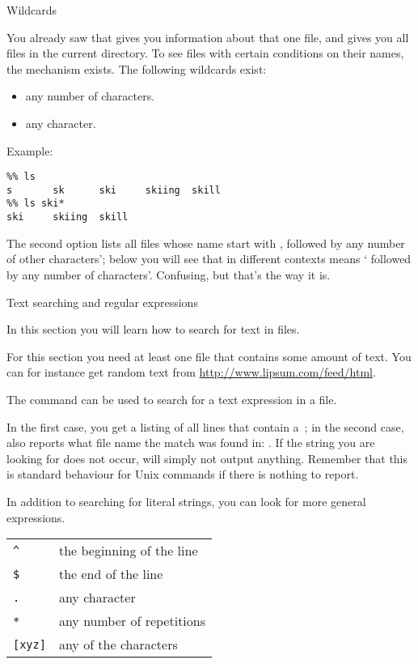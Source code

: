  {Wildcards}
\label{sec:shell-wildcard}

You already saw that  gives you information about that
one file, and  gives you all files in the current directory. To
see files with certain conditions on their names, the
 mechanism exists. The following wildcards exist:
\begin{itemize}
\item [\n{*}] any number of characters.
\item [\n{?}] any character.
\end{itemize}
Example:
\begin{verbatim}
%% ls
s       sk      ski     skiing  skill
%% ls ski*
ski     skiing  skill
\end{verbatim}
The second option lists all files whose name start with
, followed by any number of other characters'; below you will
see that in different contexts  means ` followed by any
number of  characters'. Confusing, but that's the way it is.

 {Text searching and regular expressions}
\label{sec:regexp}

\begin{purpose}
  In this section you will learn how to search for text in files.
\end{purpose}

For this section you need at least one file that contains some amount
of text. You can for instance get random text from
\url{http://www.lipsum.com/feed/html}. 

The  command can be used to search for a text expression in a
file.

{In the first case, you get a listing of all lines that contain
  a~; in the second case,  also reports what file name
  the match was found in: .}
{If the string you are looking for does not occur,  will
  simply not output anything. Remember that this is standard behaviour
for Unix commands if there is nothing to report.}

In addition to searching for literal strings, you can look for more
general expressions.

\begin{tabular}{|l|l|} 
  \hline
  \verb+^+&the beginning of the line\\
  \verb+$+&the end of the line\\
  \verb+.+&any character\\
  \verb+*+&any number of repetitions \\
  \verb+[xyz]+&any of the characters \n{xyz}\\
  \hline
\end{tabular}

